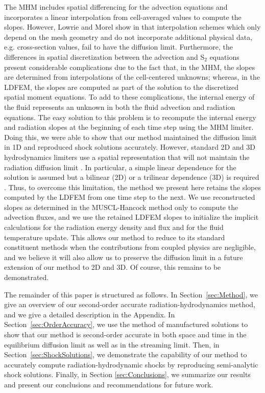 \documentclass[preprint,12pt]{elsarticle}
\begin{document}
The MHM includes spatial differencing for the advection equations and incorporates a linear interpolation from cell-averaged values to compute 
the slopes.  However, Lowrie and Morel show in \cite{lowriemorel} that interpolation schemes which only depend on the mesh geometry and do not 
incorporate additional physical data, e.g. cross-section values, fail to have the diffusion limit.  Furthermore, the differences in spatial 
discretization between the advection and S$_2$ equations present considerable complications due to the fact that, in the MHM, the slopes are 
determined from interpolations of the cell-centered unknowns; whereas, in the LDFEM, the slopes are computed as part of the solution to the 
discretized spatial moment equations.  To add to these complications, the internal energy of the fluid represents an unknown in both the 
fluid advection and radiation equations.  The easy solution to this problem is to recompute the internal energy and radiation 
slopes at the beginning of each time step using the MHM limiter.  Doing this, we were able to show that our method maintained the diffusion 
limit in 1D and reproduced shock solutions accurately.  However, standard 2D and 3D hydrodynamics limiters use a spatial representation that 
will not maintain the radiation diffusion limit \cite{zjwang}.  In particular, a simple linear dependence for the solution is assumed but a 
bilinear (2D) or a trilinear dependence (3D) is required \cite{adams}.  Thus, to overcome this limitation, the method we present here retains 
the slopes computed by the LDFEM from one time step to the next.  We use reconstructed slopes as determined in the MUSCL-Hancock method only to 
compute the advection fluxes, and we use the retained LDFEM slopes to initialize the implicit calculations for the radiation energy density and 
flux and for the fluid temperature update.  This allows our method to reduce to its standard constituent methods when the contributions from 
coupled physics are negligible, and we believe it will also allow us to preserve the diffusion limit in a future extension of our method to 
2D and 3D. Of course, this remains to be demonstrated.


The remainder of this paper is structured as follows.    In Section~\ref{sec:Method}, we give an overview of our second-order accurate
radiation-hydrodynamics method, and we give a detailed description in the Appendix.  In Section~\ref{sec:OrderAccuracy}, we use the
method of manufactured solutions to show that our method is second-order accurate in both space and time in the equilibrium diffusion limit as well as
in the streaming limit.  Then, in Section~\ref{sec:ShockSolutions}, we demonstrate the capability of our method to accurately compute
radiation-hydrodynamic shocks by reproducing semi-analytic shock solutions.  Finally, in Section \ref{sec:Conclusions}, we summarize our results and
present our conclusions and recommendations for future work.
\end{document}
